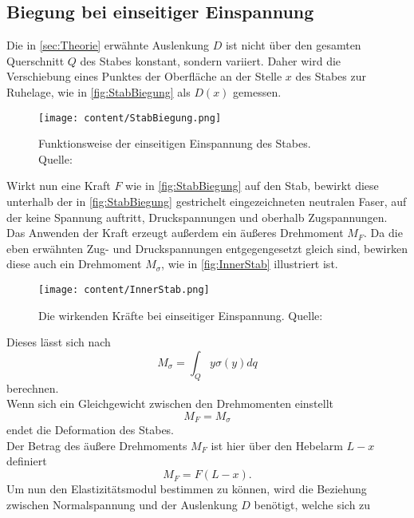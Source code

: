 \subsection{Biegung bei einseitiger Einspannung}
\label{subsec:EinseitigeEinspannung}
Die in \autoref{sec:Theorie} erwähnte Auslenkung $D$ ist nicht über den gesamten Querschnitt $Q$ des Stabes konstant,
sondern variiert. Daher wird die Verschiebung eines Punktes der Oberfläche an der Stelle $x$ des Stabes zur Ruhelage, wie in \autoref{fig:StabBiegung}
als $D(x)$ gemessen.
\begin{figure}[H]
    \centering
    \texttt{[image: content/StabBiegung.png]}
    \caption{Funktionsweise der einseitigen Einspannung des Stabes. \\Quelle: \cite{sample}}  %
    \label{fig:StabBiegung}
\end{figure}
Wirkt nun eine Kraft $F$ wie in \autoref{fig:StabBiegung} auf den Stab, bewirkt diese unterhalb der in \autoref{fig:StabBiegung}
gestrichelt eingezeichneten neutralen Faser, auf der keine Spannung auftritt, Druckspannungen und oberhalb Zugspannungen.
Das Anwenden der Kraft erzeugt außerdem ein äußeres Drehmoment $M_F$. Da die eben erwähnten Zug- und Druckspannungen entgegengesetzt gleich
sind, bewirken diese auch ein Drehmoment $M_{\sigma}$, wie in \autoref{fig:InnerStab} illustriert ist.
\begin{figure}[H]
    \centering
    \texttt{[image: content/InnerStab.png]}
    \caption{Die wirkenden Kräfte bei einseitiger Einspannung. Quelle: \cite{sample}}  %
    \label{fig:InnerStab}
\end{figure}
Dieses lässt sich nach
\begin{equation}
    \label{eqn:MSigma}
    M_{\sigma} = \int_Q y\sigma(y)dq
\end{equation}
berechnen. \\
Wenn sich ein Gleichgewicht zwischen den Drehmomenten 
einstellt
\begin{equation}
    \label{eqn:MGleich}
    M_F = M_{\sigma}
\end{equation}
endet die Deformation des Stabes.\\
Der Betrag des äußere Drehmoments $M_F$ ist hier über den Hebelarm $L-x$ definiert
\begin{equation}
    \label{eqn:MF}
    M_F = F(L-x).
\end{equation}
Um nun den Elastizitätsmodul bestimmen zu können, wird die Beziehung zwischen Normalspannung und der Auslenkung $D$ benötigt,
welche sich zu

